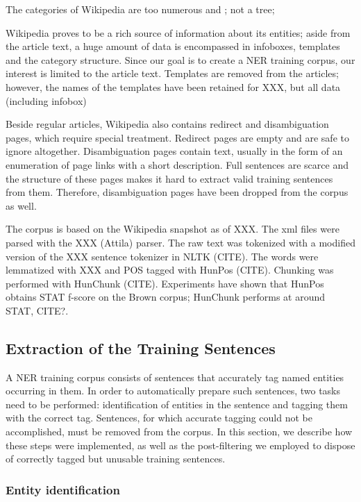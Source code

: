 \documentclass[11pt]{article}
\begin{document}
The categories of Wikipedia are too numerous and ; not a tree;

Wikipedia proves to be a rich source of information about its entities; aside from the article text, a huge amount of data is encompassed in infoboxes, templates and the category structure. Since our goal is to create a NER training corpus, our interest is limited to the article text. Templates are removed from the articles; however, the names of the templates have been retained for XXX, but all data (including infobox) 

Beside regular articles, Wikipedia also contains redirect and disambiguation pages, which require special treatment. Redirect pages are empty and are safe to ignore altogether. Disambiguation pages contain text, usually in the form of an enumeration of page links with a short description. Full sentences are scarce and the structure of these pages makes it hard to extract valid training sentences from them. Therefore, disambiguation pages have been dropped from the corpus as well.

The corpus is based on the Wikipedia snapshot as of XXX. The xml files were parsed with the XXX (Attila) parser. The raw text was tokenized with a modified version of the XXX sentence tokenizer in NLTK (CITE). The words were lemmatized with XXX and POS tagged with HunPos (CITE). Chunking was performed with HunChunk (CITE). Experiments have shown that HunPos obtains STAT f-score on the Brown corpus; HunChunk performs at around STAT, CITE?.

\subsection{Extraction of the Training Sentences}

A NER training corpus consists of sentences that accurately tag named entities occurring in them. In order to automatically prepare such sentences, two tasks need to be performed: identification of entities in the sentence and tagging them with the correct tag. Sentences, for which accurate tagging could not be accomplished, must be removed from the corpus. In this section, we describe how these steps were implemented, as well as the post-filtering we employed to dispose of correctly tagged but unusable training sentences.

\subsubsection{Entity identification}
\end{document}
